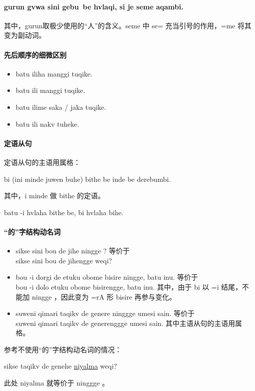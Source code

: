 \paragraph{gurun gvwa sini gebu~be hvlaqi, si je seme  aqambi.} 其中，gurun取极少使用的“人”的含义。seme 中 se= 充当引号的作用，=me 将其变为副动词。

\paragraph{先后顺序的细微区别}

\begin{itemize}
    \item batu iliha manggi tuqike.
    \item batu ili manggi tuqike.
    \item batu ilime saka / jaka tuqike.
    \item batu ili nakv tuheke.
\end{itemize}

\paragraph{定语从句} 定语从句的主语用属格：

bi (ini minde juwen buhe) bithe be inde be derebumbi.

其中，i minde   做 bithe 的定语。

batu -i hvlaha bithe be, bi  hvlaha bihe.

\paragraph{“的”字结构动名词}

\begin{itemize}
    \item sikse sini bou de jihe ningge ? 等价于\\
          sikse sini bou de jihengge weqi?
    \item bou -i dorgi de etuku obome bisire ningge, batu inu. 等价于\\
          bou -i dolo etuku obome bisirengge, batu inu. 其中，由于 bi 以 =i 结尾，不能加 ningge ，因此变为 =rA 形 bisire 再参与变化。
    \item suweni qimari taqikv de genere ninggge umesi sain. 等价于\\
          suweni qimari taqikv de generenggge umesi sain. 其中主语从句的主语用属格。
\end{itemize}

参考不使用“的”字结构动名词的情况：

sikse taqikv de genehe \underline{niyalma} weqi?

此处 niyalma 就等价于 ninggge 。

